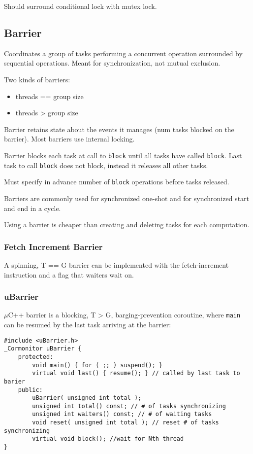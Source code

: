 \documentclass[11pt]{article}
\begin{document}
Should surround conditional lock with mutex lock.
\subsection{Barrier}
\label{sec:org610ccb5}
Coordinates a group of tasks performing a concurrent operation surrounded by sequential
operations.
Meant for synchronization, not mutual exclusion.

Two kinds of barriers:
\begin{itemize}
\item threads == group size
\item threads > group size
\end{itemize}

Barrier retains state about the events it manages (num tasks blocked on the barrier).
Most barriers use internal locking.

Barrier blocks each task at call to \texttt{block} until all tasks have called \texttt{block}.
Last task to call \texttt{block} does not block, instead it releases all other tasks.

Must specify in advance number of \texttt{block} operations before tasks released.

Barriers are commonly used for synchronized one-shot and for synchronized start
and end in a cycle.

Using a barrier is cheaper than creating and deleting tasks for each computation.
\subsubsection{Fetch Increment Barrier}
\label{sec:orgbe50fd6}
A spinning, T == G barrier can be implemented with the fetch-increment instruction
and a flag that waiters wait on.
\subsubsection{uBarrier}
\label{sec:org7aba05f}
\(\mu\)C++ barrier is a blocking, T > G, barging-prevention coroutine, where \texttt{main}
can be resumed by the last task arriving at the barrier:
\begin{verbatim}
#include <uBarrier.h>
_Cormonitor uBarrier {
    protected:
        void main() { for ( ;; ) suspend(); }
        virtual void last() { resume(); } // called by last task to barier
    public:
        uBarrier( unsigned int total );
        unsigned int total() const; // # of tasks synchronizing
        unsigned int waiters() const; // # of waiting tasks
        void reset( unsigned int total ); // reset # of tasks synchronizing
        virtual void block(); //wait for Nth thread
}
\end{verbatim}
\end{document}
